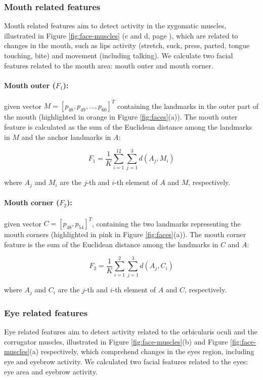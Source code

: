 \subsubsection{Mouth related features}

Mouth related features aim to detect activity in the zygomatic muscles, illustrated in Figure \ref{fig:face-muscles} (c and d, page \pageref{fig:face-muscles}), which are related to changes in the mouth, such as lips activity (stretch, suck, press, parted, tongue touching, bite) and movement (including talking). We calculate two facial features related to the mouth area: mouth outer and mouth corner.

\paragraph{Mouth outer ($F_1$):} given vector $M = [p_{48}, p_{49}, \dots, p_{60}]^T$ containing the landmarks in the outer part of the mouth (highlighted in orange in Figure \ref{fig:faces}(a)). The mouth outer feature is calculated as the sum of the Euclidean distance among the landmarks in $M$ and the anchor landmarks in $A$:

\[
F_1 = \frac{1}{K} \sum_{i=1}^{12} \sum_{j=1}^{3} d(A_j, M_i)
\]

where $A_j$ and $M_i$ are the $j$-th and $i$-th element of $A$ and $M$, respectively.

\paragraph{Mouth corner ($F_2$):} given vector $C = [p_{48}, p_{54}]^T$, containing the two landmarks representing the mouth corners (highlighted in pink in Figure \ref{fig:faces}(a)). The mouth corner feature is the sum of the Euclidean distance among the landmarks in $C$ and $A$:

\[
F_2 = \frac{1}{K} \sum_{i=1}^{2} \sum_{j=1}^{3} d(A_j, C_i)
\]

where $A_j$ and $C_i$ are the $j$-th and $i$-th element of $A$ and $C$, respectively.

\subsubsection{Eye related features}

Eye related features aim to detect activity related to the orbicularis oculi and the corrugator muscles, illustrated in Figure \ref{fig:face-muscles}(b) and Figure \ref{fig:face-muscles}(a) respectively, which comprehend changes in the eyes region, including eye and eyebrow activity. We calculated two facial features related to the eyes: eye area and eyebrow activity.

